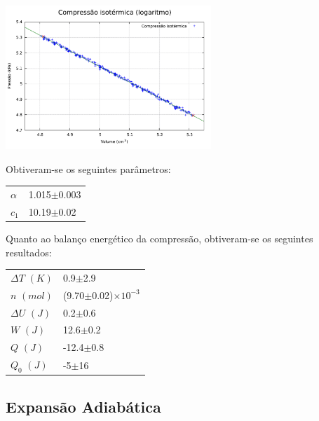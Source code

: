 \documentclass[9pt]{extarticle}
\begin{document}
\begin{multicols}{2}
\includegraphics[width=220pt]{lcomp_iso.pdf}
\begin{center}
\par{}
\end{center}

\par Obtiveram-se os seguintes parâmetros:

\begin{center}
\begin{tabular}{ x{1cm} x{2.5cm} }
\hline \hline
$\alpha$ & 1.015$\pm$0.003 \tabularnewline
$c_1$ & 10.19$\pm$0.02 \tabularnewline
\hline \hline
\end{tabular}
\end{center}

\par Quanto ao balanço energético da compressão, obtiveram-se os seguintes resultados:

\begin{center}
\begin{tabular}{ x{2cm} x{3cm} }
\hline \hline
$\Delta T$ $(K)$ & 0.9$\pm$2.9 \tabularnewline
$n$ $(mol)$ & (9.70$\pm$0.02)$\times10^{-3}$ \tabularnewline
$\Delta U$ $(J)$ & 0.2$\pm$0.6 \tabularnewline
$W$ $(J)$ & 12.6$\pm$0.2 \tabularnewline
$Q$ $(J)$ &-12.4$\pm$0.8 \tabularnewline
$Q_0$ $(J)$ & -5$\pm$16 \tabularnewline
\hline \hline
\end{tabular}
\end{center}

\subsection*{Expansão Adiabática}


\end{multicols}
\end{document}
